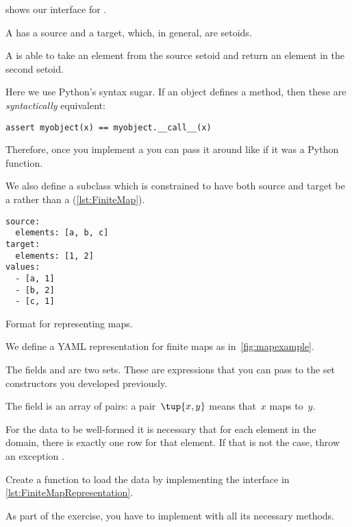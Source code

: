 
 shows our interface for \Mapping.


A \Mapping has a source and a target, which, in general, are setoids.

A \Mapping is able to take an element from the source setoid and return an element in the second setoid.

Here we use Python's syntax sugar.
If an object defines a  method, then these are \emph{syntactically} equivalent:

\begin{verbatim}
assert myobject(x) == myobject.__call__(x)
\end{verbatim}

Therefore, once you implement a \Mapping you can pass it around like if it was a Python function.

We also define a subclass \FiniteMap which is constrained to have both source and target be a \FiniteSet rather than a \Setoid (\cref{lst:FiniteMap}).


\begin{marginfigure}
    \begin{minipage}{4cm}
        \begin{verbatim}
source:
  elements: [a, b, c]
target:
  elements: [1, 2]
values:
  - [a, 1]
  - [b, 2]
  - [c, 1]
        \end{verbatim}
    \end{minipage}
    \caption{Format for representing maps.}
    \label{fig:mapexample}
\end{marginfigure}

We define a YAML representation for finite maps as in~\cref{fig:mapexample}.

The fields  and  are two sets.
These are expressions that you can pass to the set constructors you developed previously.

The field  is an array of pairs: a pair~$\tup{x, y}$ means that~$x$ maps to~$y$.

For the data to be well-formed it is necessary that for each element in the domain, there is exactly one row for that element.
If that is not the case, throw an exception .


\begin{codeexercise}
    Create a function to load the data by implementing the interface in \cref{lst:FiniteMapRepresentation}.
\end{codeexercise}


As part of the exercise, you have to implement  with all its necessary methods.

